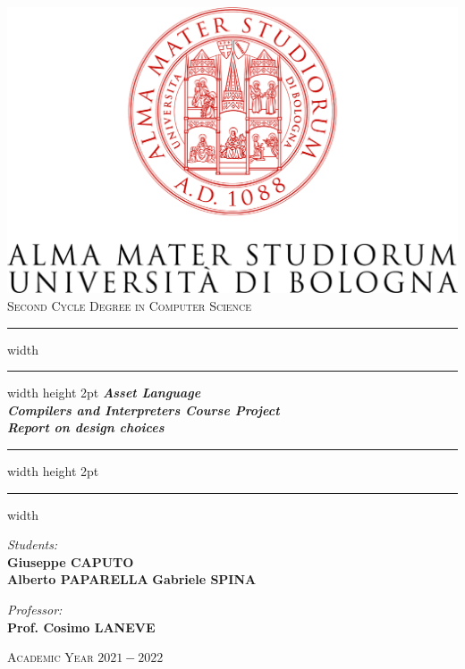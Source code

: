 \documentclass[11pt]{article} %
\begin{document}

\begin{titlepage}
	\centering
	\includegraphics[width=\textwidth]{logo.png}\\
	\vspace*{1cm}
	\Large \textsc{Second Cycle Degree in Computer Science}
	
	\vspace*{10mm}
	\hrule width \hsize \kern 1mm \hrule width \hsize height 2pt
	\vspace*{5mm}
	\Huge \emph{\textbf{Asset Language}}\\
	\large \emph{\textbf{Compilers and Interpreters  Course Project}}\\
	\large \emph{\textbf{Report on design choices}}
	\vspace*{5mm}
	\hrule width \hsize height 2pt
	\vspace*{1mm}
	\hrule width \hsize \kern 1mm
	
	\vspace*{10mm}
	\begin{minipage}{0.45\textwidth}
		\begin{flushleft} \Large
			\emph{Students:}\\
			\Large \textbf{Giuseppe \textsc{CAPUTO}}\\
			\Large \textbf{Alberto \textsc{PAPARELLA}}
			\Large \textbf{Gabriele \textsc{SPINA}}
		\end{flushleft}
	\end{minipage}	
	\begin{minipage}{0.45\textwidth}
		\begin{flushright} \Large
			\emph{Professor:}\\
			\Large \textbf{Prof. Cosimo \textsc{LANEVE}}
		\end{flushright}
	\end{minipage}
	
	\vspace*{15mm}
	\Large \textsc{Academic Year $2021-2022$}
\end{titlepage}
\end{document}
